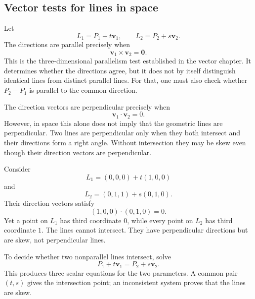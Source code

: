 \subsection{Vector tests for lines in space}

Let
\[
L_1=P_1+t\mathbf v_1,
\qquad
L_2=P_2+s\mathbf v_2.
\]
The directions are parallel precisely when
\[
\boxed{
\mathbf v_1\times\mathbf v_2=\mathbf0.
}
\]
This is the three-dimensional parallelism test established in the vector
chapter. It determines whether the directions agree, but it does not by itself
distinguish identical lines from distinct parallel lines. For that, one must
also check whether $P_2-P_1$ is parallel to the common direction.

The direction vectors are perpendicular precisely when
\[
\mathbf v_1\cdot\mathbf v_2=0.
\]
However, in space this alone does not imply that the geometric lines are
perpendicular. Two lines are perpendicular only when they both intersect and
their directions form a right angle. Without intersection they may be skew even
though their direction vectors are perpendicular.

\begin{examplebox}
Consider
\[
L_1=(0,0,0)+t(1,0,0)
\]
and
\[
L_2=(0,1,1)+s(0,1,0).
\]
Their direction vectors satisfy
\[
(1,0,0)\cdot(0,1,0)=0.
\]
Yet a point on $L_1$ has third coordinate $0$, while every point on $L_2$ has
third coordinate $1$. The lines cannot intersect. They have perpendicular
directions but are skew, not perpendicular lines.
\end{examplebox}

To decide whether two nonparallel lines intersect, solve
\[
P_1+t\mathbf v_1=P_2+s\mathbf v_2.
\]
This produces three scalar equations for the two parameters. A common pair
$(t,s)$ gives the intersection point; an inconsistent system proves that the
lines are skew.

\begin{center}
\end{center}
